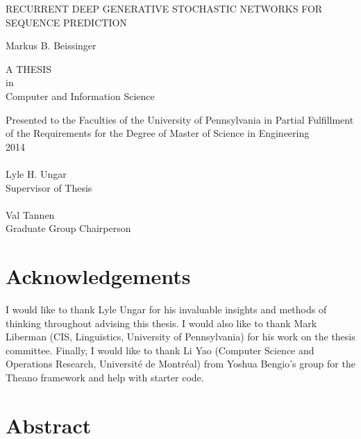 \documentclass[12pt, titlepage]{report}
\begin{document}
	\doublespacing
	
	\begin{titlepage}
		\begin{center}
			{\singlespacing \LARGE \uppercase{Recurrent Deep Generative Stochastic Networks for Sequence Prediction}\\[12pt]}
			
			{\Large Markus B. Beissinger\\[12pt]}
			
			\uppercase{a thesis}\\[12pt]					
			in\\			
			{\Large Computer and Information Science\\[48pt]}
			
			Presented to the Faculties of the University of Pennsylvania in Partial Fulfillment of the Requirements for the Degree of Master of Science in Engineering\\[12pt]
			
			2014\\[36pt]
			
			\singlespacing
			\makebox[2.5in]{\hrulefill}\\
			Lyle H. Ungar\\
			Supervisor of Thesis\\[36pt]
			
			\makebox[2.5in]{\hrulefill}\\
			Val Tannen\\
			Graduate Group Chairperson
			
			\doublespacing
		\end{center}
	\end{titlepage}
	

	\chapter*{Acknowledgements}
	I would like to thank Lyle Ungar for his invaluable insights and methods of thinking throughout advising this thesis. I would also like to thank Mark Liberman (CIS, Linguistics, University of Pennsylvania) for his work on the thesis committee. Finally, I would like to thank Li Yao (Computer Science and Operations Research, Universit\'{e} de Montr\'{e}al) from Yoshua Bengio\rq{}s group for the Theano framework and help with starter code.
	
	\chapter*{Abstract}
	
	
\end{document}
